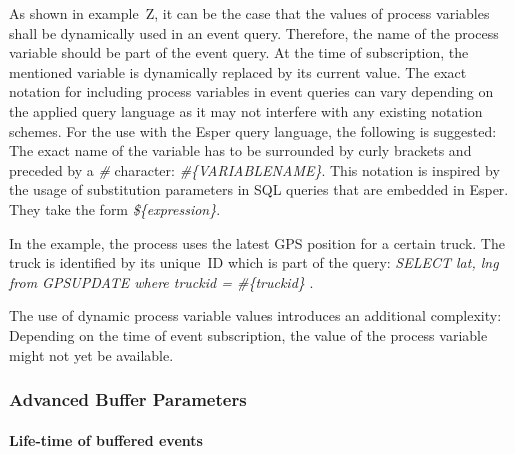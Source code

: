 

As shown in example~Z, it can be the case that the values of process variables shall be dynamically used in an event query.
Therefore, the name of the process variable should be part of the event query. At the time of subscription, the mentioned variable is dynamically replaced by its current value.
The exact notation for including process variables in event queries can vary depending on the applied query language as it may not interfere with any existing notation schemes.
For the use with the Esper query language, the following is suggested: The exact name of the variable has to be surrounded by curly brackets and preceded by a \textit{\#} character: \textit{\#\{VARIABLENAME\}}.
This notation is inspired by the usage of substitution parameters in SQL queries that are embedded in Esper. They take the form \textit{\$\{expression\}}.


In the example, the process uses the latest GPS position for a certain truck. The truck is identified by its unique~ID which is part of the query: \textit{SELECT lat, lng from GPSUPDATE where truckid = \#\{truckid\} }.

The use of dynamic process variable values introduces an additional complexity: Depending on the time of event subscription, the value of the process variable might not yet be available.


\subsubsection{Advanced Buffer Parameters}\label{ch:bpmnx:bufferpolicies}

\paragraph{Life-time of buffered events\newline}

